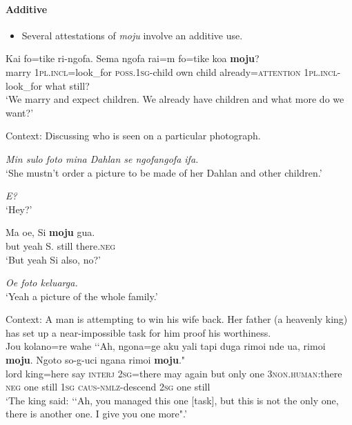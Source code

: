 \paragraph{Additive}\label{appendixTernateAdditive}
\begin{itemize}
	\item Several attestations of \textit{moju} involve an additive use.
\end{itemize}
\begin{exe}
	\ex \gll Kai fo=tike ri-ngofa. Sema ngofa rai=m fo=tike koa \textbf{moju}?\\
	marry 1\textsc{pl}.\textsc{incl}=look\_for \textsc{poss}.1\textsc{sg}-child own child already=\textsc{attention} 1\textsc{pl}.\textsc{incl}-look\_for what still?\\
	\glt \lq We marry and expect children. We already have children and what more do we want?' \parencite[92]{Hayami2001}
	
	\ex Context: Discussing who is seen on a particular photograph.\\
	\begin{xlist}
		 \textit{Min sulo foto mina Dahlan se ngofangofa ifa.}\\
		\lq She mustn’t order a picture to be made of her Dahlan and other children.'
		
		 \textit{E?}\\
		\lq Hey?'
		
		\gll Ma oe, Si \textbf{moju} gua.\\
		but yeah S. still there.\textsc{neg}\\
		\glt \lq But yeah Si also, no?'
		
		\textit{Oe foto keluarga.}\\
		\lq Yeah a picture of the whole family.' \parencite[503–504]{vanStaden2000}	
		\end{xlist}

	\ex Context: A man is attempting to win his wife back. Her father (a heavenly king) has set up a near-impossible task for him proof his worthiness.\\
	\gll Jou kolano=re wahe \lq\lq Ah, ngona=ge aku yali tapi duga rimoi nde ua, rimoi \textbf{moju}. Ngoto so-g-uci ngana rimoi \textbf{moju}."\\
	lord king=here say \phantom{\lq\lq}\textsc{interj} 2\textsc{sg}=there may again but only one 3\textsc{non}.\textsc{human}:there \textsc{neg} one still 1\textsc{sg} \textsc{caus}-\textsc{nmlz}-descend 2\textsc{sg} one still\\
	\glt \lq The king said: {\lq\lq}Ah, you managed this one  [task], but this is not the only one, there is another one. I give you one more".' \parencite[390]{vanStaden2000}
\end{exe}

